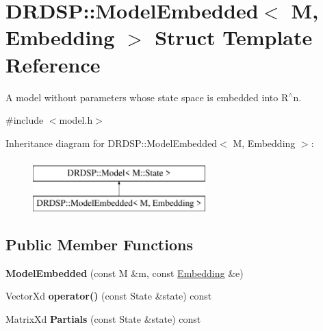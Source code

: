 \hypertarget{struct_d_r_d_s_p_1_1_model_embedded}{\section{D\-R\-D\-S\-P\-:\-:Model\-Embedded$<$ M, Embedding $>$ Struct Template Reference}
\label{struct_d_r_d_s_p_1_1_model_embedded}
}


A model without parameters whose state space is embedded into R$^\wedge$n.  




{\ttfamily \#include $<$model.\-h$>$}

Inheritance diagram for D\-R\-D\-S\-P\-:\-:Model\-Embedded$<$ M, Embedding $>$\-:\begin{figure}[H]
\begin{center}
\leavevmode
\includegraphics[height=2.000000cm]{struct_d_r_d_s_p_1_1_model_embedded}
\end{center}
\end{figure}
\subsection*{Public Member Functions}
\begin{DoxyCompactItemize}
\item 
\hypertarget{struct_d_r_d_s_p_1_1_model_embedded_ad8a54152b48b28069b9db44068c77cf8}{{\bfseries Model\-Embedded} (const M \&m, const \hyperlink{struct_d_r_d_s_p_1_1_embedding}{Embedding} \&e)}\label{struct_d_r_d_s_p_1_1_model_embedded_ad8a54152b48b28069b9db44068c77cf8}

\item 
\hypertarget{struct_d_r_d_s_p_1_1_model_embedded_a5144526af08841b1063aefbed7662ce9}{Vector\-Xd {\bfseries operator()} (const State \&state) const }\label{struct_d_r_d_s_p_1_1_model_embedded_a5144526af08841b1063aefbed7662ce9}

\item 
\hypertarget{struct_d_r_d_s_p_1_1_model_embedded_a9cbb3e4d6c8a52ab9b534611ef76a56c}{Matrix\-Xd {\bfseries Partials} (const State \&state) const }\label{struct_d_r_d_s_p_1_1_model_embedded_a9cbb3e4d6c8a52ab9b534611ef76a56c}

\end{DoxyCompactItemize}

